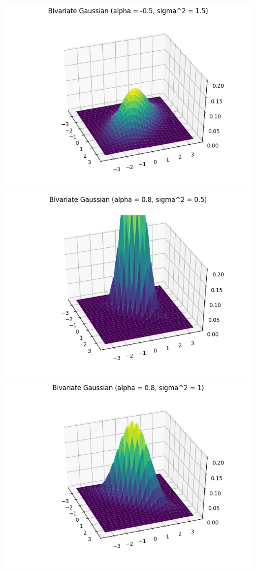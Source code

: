 \documentclass{article}
\begin{document}
\includegraphics[width=\linewidth]{Bivariate Gaussian (alpha = -0.5, sigma^2 = 1.5).png}
\includegraphics[width=\linewidth]{Bivariate Gaussian (alpha = 0.8, sigma^2 = 0.5).png}
\includegraphics[width=\linewidth]{Bivariate Gaussian (alpha = 0.8, sigma^2 = 1).png}
\end{document}

